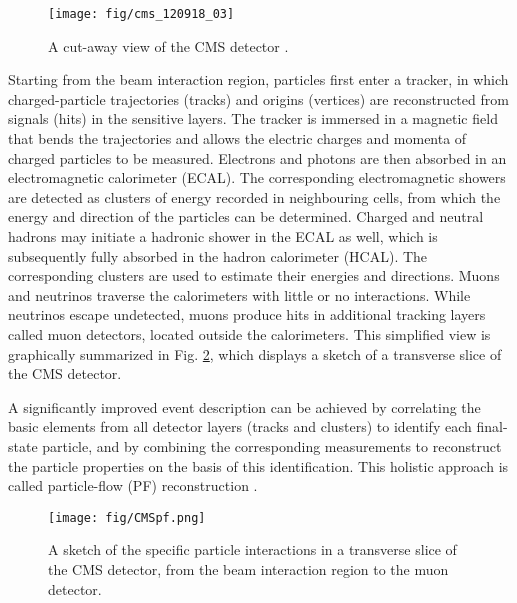 \begin{figure}[hbtp]
\centering
\def\twidth{1}
\texttt{[image: fig/cms\_120918\_03]}
\caption{A cut-away view of the CMS detector \cite{Sakuma:2013jqa}.}
\label{fig:CMS_detector}
\end{figure}


Starting from the beam interaction region, particles first enter a tracker, in which charged-particle trajectories (tracks) and origins (vertices) are reconstructed from signals (hits) in the sensitive layers.  The tracker is immersed in a magnetic field that bends the trajectories and allows the electric charges and momenta of charged particles to be measured. Electrons and photons are then absorbed in an electromagnetic calorimeter (ECAL). The corresponding electromagnetic showers are detected as clusters of energy recorded in neighbouring cells, from which the energy and direction of the particles can be determined.  Charged and neutral hadrons may initiate a hadronic shower in the ECAL as well, which is subsequently fully absorbed in the hadron calorimeter (HCAL). The corresponding clusters are used to estimate their energies and directions.  Muons and neutrinos traverse the calorimeters with little or no interactions. While neutrinos escape undetected, muons produce hits in additional tracking layers called muon detectors, located outside the calorimeters. This simplified view is graphically summarized in Fig.  \ref{fig:CMSpf}, which displays a sketch of a transverse slice of the CMS detector.

A significantly improved event description can be achieved by correlating the basic elements from all detector layers (tracks and clusters) to identify each final-state particle, and by combining the corresponding measurements to reconstruct the particle properties on the basis of this identification. This holistic approach is called particle-flow (PF) reconstruction \cite{Sirunyan:2017ulk}.

\begin{figure}[h]
  \centering
  \texttt{[image: fig/CMSpf.png]}
  \caption{A sketch of the specific particle interactions in a transverse slice of the CMS detector, from the beam interaction region to the muon detector.}
  \label{fig:CMSpf}
\end{figure}

